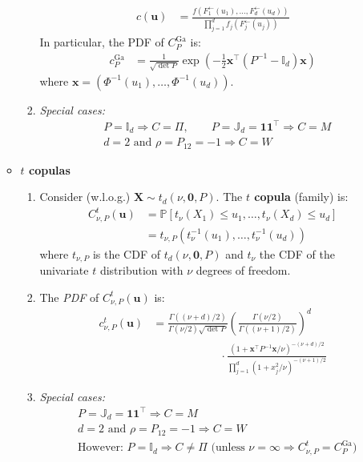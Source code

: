 \documentclass[a4paper,landscape,8pt,fleqn]{scrartcl}
\renewcommand{\emph}[1]{\textbf{#1}}
\begin{document}
\begin{multicols*}{3}
\begin{itemize}
\begin{itemize}
\begin{enumerate}
\begin{align*}
c(\bm u) &= \frac{f(F_1^\leftarrow(u_1), \ldots, F_d^\leftarrow(u_d))}{\prod_{j=1}^d f_j(F_j^\leftarrow(u_j))}
\end{align*}
In particular, the PDF of $C_P^\text{Ga}$ is:
\begin{align*}
c_P^\text{Ga} &= \frac{1}{\sqrt{\det P}} \exp \left( -\frac{1}{2} \bm x^\top (P^{-1} - \mathbb{I}_d) \bm x \right)
\end{align*}
where $\bm x = (\Phi^{-1}(u_1), \ldots, \Phi^{-1}(u_d))$.
\item \textit{Special cases:}
\begin{align*}
&P = \mathbb{I}_d \Rightarrow C = \Pi, \qquad P = \mathbb{J}_d = \bm 1 \bm 1^\top \Rightarrow C = M \\
&d=2 \text{ and } \rho = P_{12} = -1 \Rightarrow C = W
\end{align*}
\end{enumerate}
\item \emph{$t$ copulas}
\begin{enumerate}
\item Consider (w.l.o.g.) $\bm X \sim t_d(\nu, \bm 0, P)$. The \emph{$t$ copula} (family) is:
\begin{align*}
C_{\nu, P}^t(\bm u) &= \mathbb{P}[t_\nu(X_1) \leq u_1, \ldots, t_\nu(X_d) \leq u_d] \\
&= t_{\nu, P}(t_\nu^{-1}(u_1), \ldots, t_\nu^{-1}(u_d))
\end{align*}
where $t_{\nu, P}$ is the CDF of $t_d(\nu, \bm 0, P)$ and $t_\nu$ the CDF of the univariate $t$ distribution with $\nu$ degrees of freedom.
\item The \textit{PDF} of $C_{\nu,P}^t(\bm u)$ is:
\begin{align*}
c_{\nu, P}^t(\bm u) &= \frac{\Gamma((\nu+d)/2)}{\Gamma(\nu/2) \sqrt{\det P}} \left( \frac{\Gamma(\nu/2)}{\Gamma((\nu+1)/2)} \right)^d \\
&\qquad \qquad \qquad \cdot \frac{(1 + \bm x^\top P^{-1} \bm x / \nu)^{-(\nu+d)/2}}{\prod_{j=1}^d(1 + x_j^2/\nu)^{-(\nu+1)/2}}
\end{align*}
\item \textit{Special cases:}
\begin{align*}
&P = \mathbb{J}_d = \bm 1 \bm 1^\top \Rightarrow C = M \\
&d=2 \text{ and } \rho = P_{12} = -1 \Rightarrow C = W \\
&\text{However: } P = \mathbb{I}_d \Rightarrow C \neq \Pi \text{ (unless } \nu=\infty \Rightarrow C_{\nu,P}^t = C_P^\text{Ga} \text{)}

\end{align*}
\end{enumerate}
\end{itemize}
\end{itemize}
\end{multicols*}
\end{document}
